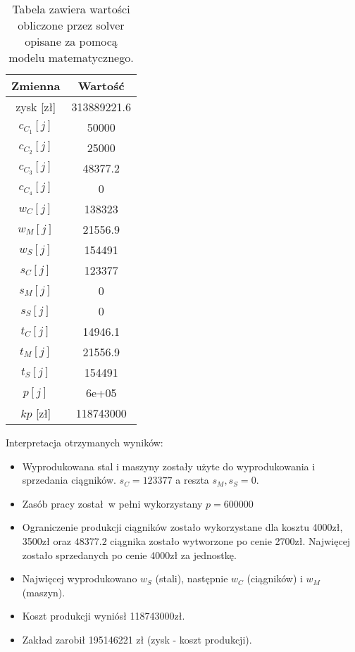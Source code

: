 \documentclass{article}
\begin{document}
\begin{table}[H]
  \begin{center}
    \begin{tabular}{|c | c| }
      \hline
      Zmienna & Wartość \\ 
      \hline
      zysk [zł] & 313889221.6 \\
      \hline
      $c_C_1 [j]$& 50000\\
      \hline
      $c_C_2 [j]$&          25000 \\
      \hline
      $c_C_3 [j]$&       48377.2 \\
      \hline
      $c_C_4 [j]$&        0 \\
      \hline
      $w_C [j]$&        138323 \\
      \hline
      $w_M [j]$&         21556.9 \\
      \hline
      $w_S [j]$&        154491 \\
      \hline
      $s_C [j]$&        123377 \\
      \hline
      $s_M [j]$&             0 \\
      \hline
      $s_S [j]$&             0 \\
      \hline
      $t_C [j]$&         14946.1 \\
      \hline
      $t_M [j]$&         21556.9 \\
      \hline
      $t_S [j]$&        154491 \\
      \hline
      $p [j]$&                6e+05 \\
      \hline
      $kp$ [zł] &  118743000 \\
      \hline
    \end{tabular} 
    \caption{\label{table:setka}Tabela zawiera wartości obliczone przez solver opisane za pomocą modelu matematycznego.}
  \end{center}
\end{table}

Interpretacja otrzymanych wyników:

\begin{itemize}
  \item Wyprodukowana stal i maszyny zostały użyte do wyprodukowania i sprzedania ciągników. $s_C = 123377$ a reszta $s_M , s_S = 0$.
  \item Zasób pracy został w pełni wykorzystany $p = 600000$
  \item Ograniczenie produkcji ciągników zostało wykorzystane dla kosztu 4000zł, 3500zł oraz $48377.2$ ciągnika zostało wytworzone po cenie 2700zł. Najwięcej zostało sprzedanych po cenie 4000zł za jednostkę.
  \item Najwięcej wyprodukowano $w_S$ (stali), następnie $w_C$ (ciągników) i $w_M$ (maszyn).
  \item Koszt produkcji wyniósł 118743000zł.
  \item Zakład zarobił 195146221 zł (zysk - koszt produkcji).
\end{itemize}
\end{document}
